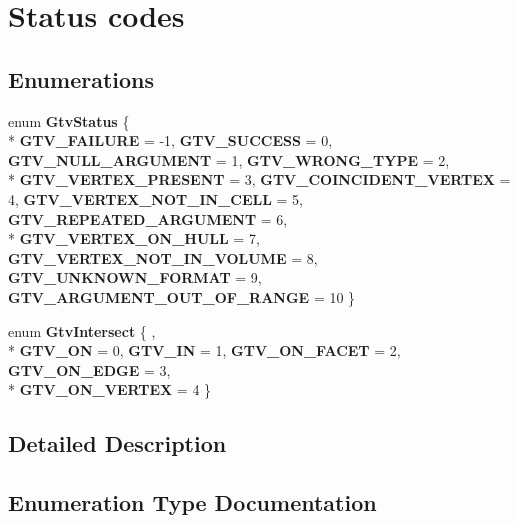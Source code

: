 \section{Status codes}
\label{group__status}
\subsection*{Enumerations}
\begin{DoxyCompactItemize}
\item 
enum {\bf Gtv\+Status} \{ \\*
{\bf G\+T\+V\+\_\+\+F\+A\+I\+L\+U\+R\+E} = -\/1, 
{\bf G\+T\+V\+\_\+\+S\+U\+C\+C\+E\+S\+S} = 0, 
{\bf G\+T\+V\+\_\+\+N\+U\+L\+L\+\_\+\+A\+R\+G\+U\+M\+E\+N\+T} = 1, 
{\bf G\+T\+V\+\_\+\+W\+R\+O\+N\+G\+\_\+\+T\+Y\+P\+E} = 2, 
\\*
{\bf G\+T\+V\+\_\+\+V\+E\+R\+T\+E\+X\+\_\+\+P\+R\+E\+S\+E\+N\+T} = 3, 
{\bf G\+T\+V\+\_\+\+C\+O\+I\+N\+C\+I\+D\+E\+N\+T\+\_\+\+V\+E\+R\+T\+E\+X} = 4, 
{\bf G\+T\+V\+\_\+\+V\+E\+R\+T\+E\+X\+\_\+\+N\+O\+T\+\_\+\+I\+N\+\_\+\+C\+E\+L\+L} = 5, 
{\bf G\+T\+V\+\_\+\+R\+E\+P\+E\+A\+T\+E\+D\+\_\+\+A\+R\+G\+U\+M\+E\+N\+T} = 6, 
\\*
{\bf G\+T\+V\+\_\+\+V\+E\+R\+T\+E\+X\+\_\+\+O\+N\+\_\+\+H\+U\+L\+L} = 7, 
{\bf G\+T\+V\+\_\+\+V\+E\+R\+T\+E\+X\+\_\+\+N\+O\+T\+\_\+\+I\+N\+\_\+\+V\+O\+L\+U\+M\+E} = 8, 
{\bf G\+T\+V\+\_\+\+U\+N\+K\+N\+O\+W\+N\+\_\+\+F\+O\+R\+M\+A\+T} = 9, 
{\bf G\+T\+V\+\_\+\+A\+R\+G\+U\+M\+E\+N\+T\+\_\+\+O\+U\+T\+\_\+\+O\+F\+\_\+\+R\+A\+N\+G\+E} = 10
 \}
\item 
enum {\bf Gtv\+Intersect} \{ , \\*
{\bf G\+T\+V\+\_\+\+O\+N} = 0, 
{\bf G\+T\+V\+\_\+\+I\+N} = 1, 
{\bf G\+T\+V\+\_\+\+O\+N\+\_\+\+F\+A\+C\+E\+T} = 2, 
{\bf G\+T\+V\+\_\+\+O\+N\+\_\+\+E\+D\+G\+E} = 3, 
\\*
{\bf G\+T\+V\+\_\+\+O\+N\+\_\+\+V\+E\+R\+T\+E\+X} = 4
 \}
\end{DoxyCompactItemize}


\subsection{Detailed Description}


\subsection{Enumeration Type Documentation}
